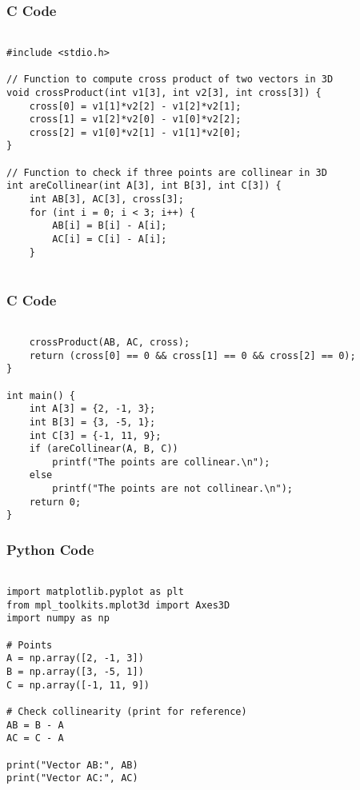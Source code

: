 \documentclass{beamer}
\begin{document}
\begin{frame}[fragile]
    \frametitle{C Code }
    \begin{lstlisting}

#include <stdio.h>

// Function to compute cross product of two vectors in 3D
void crossProduct(int v1[3], int v2[3], int cross[3]) {
    cross[0] = v1[1]*v2[2] - v1[2]*v2[1];
    cross[1] = v1[2]*v2[0] - v1[0]*v2[2];
    cross[2] = v1[0]*v2[1] - v1[1]*v2[0];
}

// Function to check if three points are collinear in 3D
int areCollinear(int A[3], int B[3], int C[3]) {
    int AB[3], AC[3], cross[3];
    for (int i = 0; i < 3; i++) {
        AB[i] = B[i] - A[i];
        AC[i] = C[i] - A[i];
    }


    \end{lstlisting}
\end{frame}

\begin{frame}[fragile]
    \frametitle{C Code }
    \begin{lstlisting}

    crossProduct(AB, AC, cross);
    return (cross[0] == 0 && cross[1] == 0 && cross[2] == 0);
}

int main() {
    int A[3] = {2, -1, 3};
    int B[3] = {3, -5, 1};
    int C[3] = {-1, 11, 9};
    if (areCollinear(A, B, C))
        printf("The points are collinear.\n");
    else
        printf("The points are not collinear.\n");
    return 0;
}
    \end{lstlisting}
\end{frame}







\begin{frame}[fragile]
    \frametitle{Python Code}
    \begin{lstlisting}

import matplotlib.pyplot as plt
from mpl_toolkits.mplot3d import Axes3D
import numpy as np

# Points
A = np.array([2, -1, 3])
B = np.array([3, -5, 1])
C = np.array([-1, 11, 9])

# Check collinearity (print for reference)
AB = B - A
AC = C - A

print("Vector AB:", AB)
print("Vector AC:", AC)








    \end{lstlisting}
\end{frame}
\end{document}
